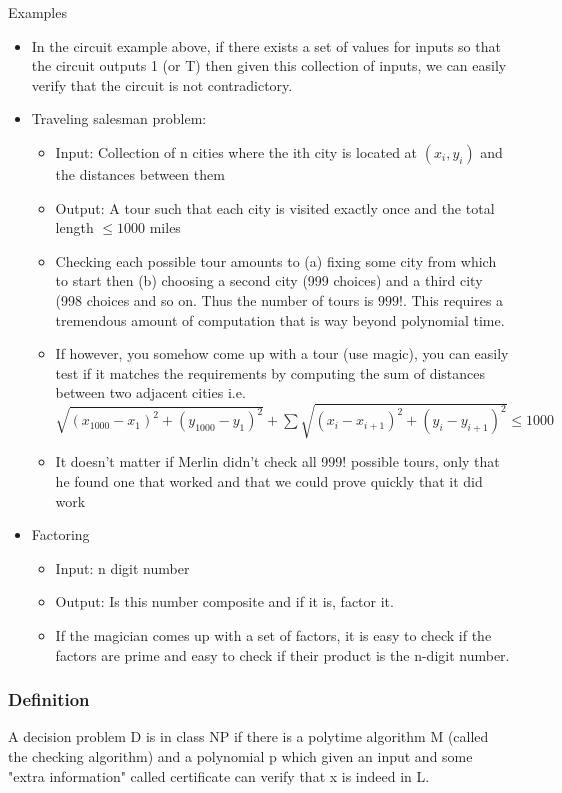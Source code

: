 \documentclass[9pt, letterpaper, oneside]{article}
\begin{document}
Examples
\begin{itemize}
	\item In the circuit example above, if there exists a set of values for inputs so that the circuit outputs 1 (or T) then given this collection of inputs, we can easily verify that the circuit is not contradictory. 
	\item Traveling salesman problem:
		\begin{itemize}
			\item Input: Collection of n cities where the ith city is located at $(x_i, y_i)$ and the distances between them
			\item Output: A tour such that each city is visited exactly once and the total length $\leq 1000$ miles
			\item Checking each possible tour amounts to (a) fixing some city from which to start then (b) choosing a second city (999 choices) and a third city (998 choices and so on. Thus the number of tours is $999!$. This requires a tremendous amount of computation that is way beyond polynomial time.
			\item If however, you somehow come up with a tour (use magic), you can easily test if it matches the requirements by computing the sum of distances between two adjacent cities i.e.\\ $\sqrt{(x_{1000} - x_1)^2 + (y_{1000} - y_1)^2} + \sum{\sqrt{(x_{i} - x_{i+1})^2 + (y_{i} - y_{i+1})^2}} \leq 1000$
			\item It doesn't matter if Merlin didn't check all 999! possible tours, only that he found one that worked and that we could prove quickly that it did work
		\end{itemize}
	\item Factoring
		\begin{itemize}
			\item Input: n digit number
			\item Output: Is this number composite and if it is, factor it.
			\item If the magician comes up with a set of factors, it is easy to check if the factors are prime and easy to check if their product is the n-digit number.
		\end{itemize} 	
\end{itemize}

\subsubsection{Definition}
A decision problem D is in class NP if there is a polytime algorithm M (called the checking algorithm) and a polynomial p which given an input and some "extra information" called certificate can verify that x is indeed in L.
\end{document}

